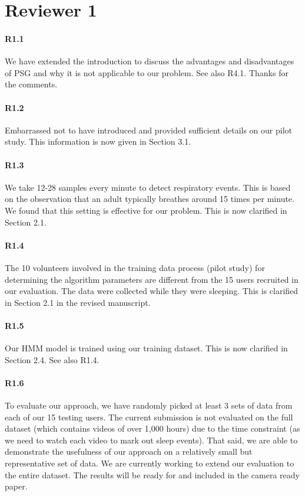 \section*{Reviewer 1}
\vspace{-2mm}
\paragraph{R1.1} We have extended the introduction to discuss the advantages and disadvantages of PSG and why it is not applicable to our
problem. See also R4.1. Thanks for the comments.

\paragraph{R1.2} Embarrassed not to have introduced and provided sufficient details on our pilot study. This information is now given in Section 3.1.
\vspace{-2mm}
\paragraph{R1.3} We take 12-28 samples every minute to detect respiratory events. This is based on the observation that an adult typically
breathes around 15 times per minute. We found that this setting is effective for our problem. This is now clarified in Section 2.1.

\paragraph{R1.4} The 10 volunteers involved in the training data process (pilot study) for determining the algorithm parameters are different from the 15 users recruited in our
evaluation. The data were collected while they were sleeping. This is clarified in Section 2.1 in the revised manuscript.

\paragraph{R1.5} Our HMM model is trained using our training dataset. This is now clarified in Section 2.4. See also R1.4.
\vspace{-2mm}
\paragraph{R1.6} To evaluate our approach, we have randomly picked at least 3 sets of data from each of our 15 testing users.
The current submission is not evaluated on the full dataset (which contains videos of over 1,000 hours) due to the time constraint (as we
need to watch each video to mark out sleep events). That said, we are able to demonstrate the usefulness of our approach on a relatively
small but representative set of data. We are currently working to extend our evaluation to the entire dataset. The results will be ready
for and included in the camera ready paper.


